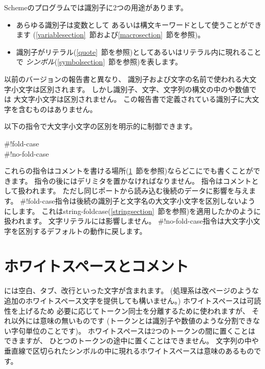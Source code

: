 \vest Schemeのプログラムでは識別子に2つの用途があります。
\begin{itemize}
\item あらゆる識別子は変数として
あるいは構文キーワードとして使うことができます
(\ref{variablesection}~節および\ref{macrosection}~節を参照)。

\item 識別子がリテラル(\ref{quote}~節を参照)としてあるいはリテラル内に現れることで
{\em シンボル}(\ref{symbolsection}~節を参照)を表します。
\end{itemize}

以前のバージョンの報告書\cite{R5RS}と異なり、
識別子および文字の名前で使われる大文字小文字は区別されます。
しかし識別子、文字、文字列の構文の中のや数値では
大文字小文字は区別されません。
この報告書で定義されている識別子に大文字を含むものはありません。

以下の指令で大文字小文字の区別を明示的に制御できます。

\begin{entry}{%
{\cf{}\#!fold-case}\\
{\cf{}\#!no-fold-case}}

これらの指令はコメントを書ける場所(\ref{wscommentsection}~節を参照)ならどこにでも書くことができます。
指令の後にはデリミタを置かなければなりません。
指令はコメントとして扱われます。
ただし同じポートから読み込む後続のデータに影響を与えます。
{\cf{}\#!fold-case}指令は後続の識別子と文字名の大文字小文字を区別しないようにします。
これは{\cf string-foldcase}(\ref{stringsection}~節を参照)を適用したかのように扱われます。
文字リテラルには影響しません。
{\cf{}\#!no-fold-case}指令は大文字小文字を区別するデフォルトの動作に戻します。
\end{entry}



\section{ホワイトスペースとコメント}
\label{wscommentsection}

には空白、タブ、改行といった文字が含まれます。
(処理系は改ページのような追加のホワイトスペース文字を提供しても構いません。)
ホワイトスペースは可読性を上げるため
必要に応じてトークン同士を分離するために使われますが、
それ以外には意味の無いものです
(トークンとは識別子や数値のような分割できない字句単位のことです)。
ホワイトスペースは2つのトークンの間に置くことはできますが、
ひとつのトークンの途中に置くことはできません。
文字列の中や垂直線で区切られたシンボルの中に現れるホワイトスペースは意味のあるものです。

